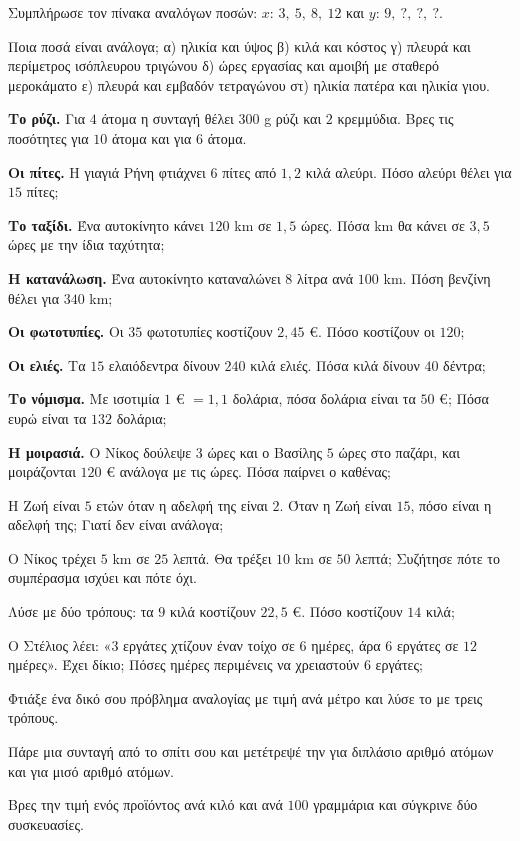 \ex Συμπλήρωσε τον πίνακα αναλόγων ποσών: $x$: $3,\ 5,\ 8,\ 12$ και $y$: $9,\ ?,\ ?,\ ?$.

\ex Ποια ποσά είναι ανάλογα; α) ηλικία και ύψος \quad β) κιλά και κόστος \quad γ) πλευρά και περίμετρος ισόπλευρου τριγώνου \quad δ) ώρες εργασίας και αμοιβή με σταθερό μεροκάματο \quad ε) πλευρά και εμβαδόν τετραγώνου \quad στ) ηλικία πατέρα και ηλικία γιου.


\ex \textbf{Το ρύζι.} Για $4$ άτομα η συνταγή θέλει $300$ g ρύζι και $2$ κρεμμύδια. Βρες τις ποσότητες για $10$ άτομα και για $6$ άτομα.

\ex \textbf{Οι πίτες.} Η γιαγιά Ρήνη φτιάχνει $6$ πίτες από $1{,}2$ κιλά αλεύρι. Πόσο αλεύρι θέλει για $15$ πίτες;

\ex \textbf{Το ταξίδι.} Ένα αυτοκίνητο κάνει $120$ km σε $1{,}5$ ώρες. Πόσα km θα κάνει σε $3{,}5$ ώρες με την ίδια ταχύτητα;

\ex \textbf{Η κατανάλωση.} Ένα αυτοκίνητο καταναλώνει $8$ λίτρα ανά $100$ km. Πόση βενζίνη θέλει για $340$ km;

\ex \textbf{Οι φωτοτυπίες.} Οι $35$ φωτοτυπίες κοστίζουν $2{,}45$ €. Πόσο κοστίζουν οι $120$;

\ex \textbf{Οι ελιές.} Τα $15$ ελαιόδεντρα δίνουν $240$ κιλά ελιές. Πόσα κιλά δίνουν $40$ δέντρα;

\ex \textbf{Το νόμισμα.} Με ισοτιμία $1$ € $=1{,}1$ δολάρια, πόσα δολάρια είναι τα $50$ €; Πόσα ευρώ είναι τα $132$ δολάρια;

\ex \textbf{Η μοιρασιά.} Ο Νίκος δούλεψε $3$ ώρες και ο Βασίλης $5$ ώρες στο παζάρι, και μοιράζονται $120$ € ανάλογα με τις ώρες. Πόσα παίρνει ο καθένας;


\ex Η Ζωή είναι $5$ ετών όταν η αδελφή της είναι $2$. Όταν η Ζωή είναι $15$, πόσο είναι η αδελφή της; Γιατί δεν είναι ανάλογα;

\ex Ο Νίκος τρέχει $5$ km σε $25$ λεπτά. Θα τρέξει $10$ km σε $50$ λεπτά; Συζήτησε πότε το συμπέρασμα ισχύει και πότε όχι.

\ex Λύσε με δύο τρόπους: τα $9$ κιλά κοστίζουν $22{,}5$ €. Πόσο κοστίζουν $14$ κιλά;

\ex Ο Στέλιος λέει: «$3$ εργάτες χτίζουν έναν τοίχο σε $6$ ημέρες, άρα $6$ εργάτες σε $12$ ημέρες». Έχει δίκιο; Πόσες ημέρες περιμένεις να χρειαστούν $6$ εργάτες;

\ex Φτιάξε ένα δικό σου πρόβλημα αναλογίας με τιμή ανά μέτρο και λύσε το με τρεις τρόπους.


\ex Πάρε μια συνταγή από το σπίτι σου και μετέτρεψέ την για διπλάσιο αριθμό ατόμων και για μισό αριθμό ατόμων.

\ex Βρες την τιμή ενός προϊόντος ανά κιλό και ανά $100$ γραμμάρια και σύγκρινε δύο συσκευασίες.
